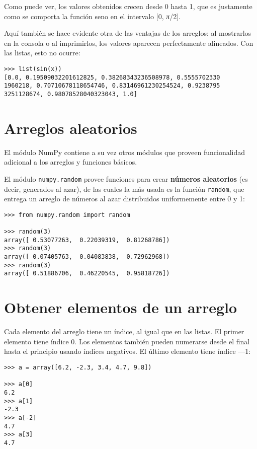 Como puede ver, los valores obtenidos crecen desde 0 hasta 1, que es
justamente como se comporta la función seno en el intervalo {[}0,
\emph{π}/2{]}.

Aquí también se hace evidente otra de las ventajas de los arreglos: al
mostrarlos en la consola o al imprimirlos, los valores aparecen
perfectamente alineados. Con las listas, esto no ocurre:

\begin{lstlisting}
>>> list(sin(x))
[0.0, 0.19509032201612825, 0.38268343236508978, 0.5555702330
1960218, 0.70710678118654746, 0.83146961230254524, 0.9238795
3251128674, 0.98078528040323043, 1.0]
\end{lstlisting}

\section{Arreglos aleatorios}

El módulo NumPy contiene a su vez otros módulos que proveen
funcionalidad adicional a los arreglos y funciones básicos.

El módulo \lstinline!numpy.random! provee funciones para crear
\textbf{números aleatorios} (es decir, generados al azar), de las cuales
la más usada es la función \lstinline!random!, que entrega un arreglo de
números al azar distribuidos uniformemente entre 0 y 1:

\begin{lstlisting}
>>> from numpy.random import random

>>> random(3)
array([ 0.53077263,  0.22039319,  0.81268786])
>>> random(3)
array([ 0.07405763,  0.04083838,  0.72962968])
>>> random(3)
array([ 0.51886706,  0.46220545,  0.95818726])
\end{lstlisting}

\section{Obtener elementos de un arreglo}

Cada elemento del arreglo tiene un índice, al igual que en las listas.
El primer elemento tiene índice 0. Los elementos también pueden
numerarse desde el final hasta el principio usando índices negativos. El
último elemento tiene índice ---1:

\begin{lstlisting}
>>> a = array([6.2, -2.3, 3.4, 4.7, 9.8])

>>> a[0]
6.2
>>> a[1]
-2.3
>>> a[-2]
4.7
>>> a[3]
4.7
\end{lstlisting}

